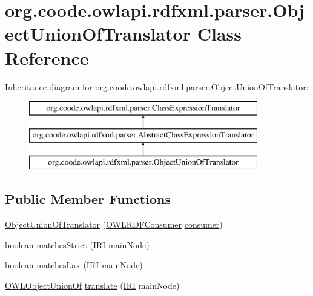 \hypertarget{classorg_1_1coode_1_1owlapi_1_1rdfxml_1_1parser_1_1_object_union_of_translator}{\section{org.\-coode.\-owlapi.\-rdfxml.\-parser.\-Object\-Union\-Of\-Translator Class Reference}
\label{classorg_1_1coode_1_1owlapi_1_1rdfxml_1_1parser_1_1_object_union_of_translator}
}
Inheritance diagram for org.\-coode.\-owlapi.\-rdfxml.\-parser.\-Object\-Union\-Of\-Translator\-:\begin{figure}[H]
\begin{center}
\leavevmode
\includegraphics[height=3.000000cm]{classorg_1_1coode_1_1owlapi_1_1rdfxml_1_1parser_1_1_object_union_of_translator}
\end{center}
\end{figure}
\subsection*{Public Member Functions}
\begin{DoxyCompactItemize}
\item 
\hyperlink{classorg_1_1coode_1_1owlapi_1_1rdfxml_1_1parser_1_1_object_union_of_translator_ae94e50e65a7ad9cbab3c5e0bc8b4464e}{Object\-Union\-Of\-Translator} (\hyperlink{classorg_1_1coode_1_1owlapi_1_1rdfxml_1_1parser_1_1_o_w_l_r_d_f_consumer}{O\-W\-L\-R\-D\-F\-Consumer} \hyperlink{classorg_1_1coode_1_1owlapi_1_1rdfxml_1_1parser_1_1_abstract_class_expression_translator_ae547084cdd5b92c03835b5aa404f823b}{consumer})
\item 
boolean \hyperlink{classorg_1_1coode_1_1owlapi_1_1rdfxml_1_1parser_1_1_object_union_of_translator_a1d060557a3bbd3e5c62d083b7400d6d2}{matches\-Strict} (\hyperlink{classorg_1_1semanticweb_1_1owlapi_1_1model_1_1_i_r_i}{I\-R\-I} main\-Node)
\item 
boolean \hyperlink{classorg_1_1coode_1_1owlapi_1_1rdfxml_1_1parser_1_1_object_union_of_translator_a7e19634e383af9c9259fb846cf23c5ee}{matches\-Lax} (\hyperlink{classorg_1_1semanticweb_1_1owlapi_1_1model_1_1_i_r_i}{I\-R\-I} main\-Node)
\item 
\hyperlink{interfaceorg_1_1semanticweb_1_1owlapi_1_1model_1_1_o_w_l_object_union_of}{O\-W\-L\-Object\-Union\-Of} \hyperlink{classorg_1_1coode_1_1owlapi_1_1rdfxml_1_1parser_1_1_object_union_of_translator_a329ea53706c0c2c5144837ac32049539}{translate} (\hyperlink{classorg_1_1semanticweb_1_1owlapi_1_1model_1_1_i_r_i}{I\-R\-I} main\-Node)
\end{DoxyCompactItemize}
